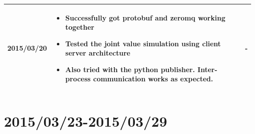 \documentclass[11pt]{article} %
\begin{document}
\begin{center}
\begin{longtable}{ | c | p{6cm} | p{5cm} |}
  2015/03/20         & 
  \begin{itemize}
  \item Successfully got protobuf and zeromq working together
  \item Tested the joint value simulation using client server architecture
  \item Also tried with the python publisher. Inter-process communication works as expected.
\end{itemize}   
  & 
- \\
  										 \hline
  																	 
  										   										 
    \end{longtable}
\end{center}

\newpage
\section{2015/03/23-2015/03/29}
\end{document}
